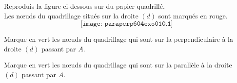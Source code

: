 \begin{myenumerate}
  \item Reproduis la figure ci-dessous sur du papier quadrillé.\\Les n\oe uds du quadrillage situés sur la droite $(d)$ sont marqués en rouge.
\[\texttt{[image: paraperp604exo010.1]}\]
\item Marque en vert les n\oe uds du quadrillage qui sont sur la perpendiculaire à la droite $(d)$ passant par $A$.
\item Marque en vert les n\oe uds du quadrillage qui sont sur la parallèle à la droite $(d)$ passant par $A$.
\end{myenumerate}